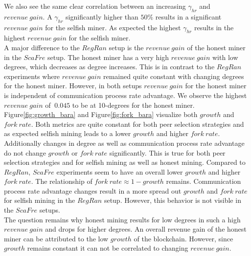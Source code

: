 We also see the same clear correlation between an increasing $\gamma_{hr}$ and $revenue~gain$. A $\gamma_{hr}$ significantly higher than $50\% $ results in a significant $revenue~gain$ for the selfish miner. As expected the highest $\gamma_{hr}$ results in the highest $revenue~gain$ for the selfish miner.\\
A major difference to the $RegRan$ setup is the $revenue~gain$ of the honest miner in the $ScaFre$ setup. The honest miner has a very high $revenue~gain$ with low degrees, which decreases as degree increases. This is in contrast to the $RegRan$ experiments where  $revenue~gain$ remained quite constant with changing degrees for the honest miner. However, in both setups $revenue~gain$ for the honest miner is independent of communication process rate advantage. We observe the highest $revenue~gain$ of $~0.045$ to be at 10-degrees for the honest miner.\\
Figure\ref{fig:growth_bara} and Figure\ref{fig:fork_bara} visualize both $growth$ and $fork~rate$. Both metrics are quite constant for both peer selection strategies and as expected selfish mining leads to a lower $growth$ and higher $fork~rate$. Additionally changes in degree as well as communication process rate advantage do not change $growth$ or $fork~rate$ significantly. This is true for both peer selection strategies and for selfish mining as well as honest mining. Compared to $RegRan$, $ScaFre$ experiments seem to have an overall lower $growth$ and higher $fork~rate$. The relationship of $fork~rate \approx 1-growth$ remains. Communication process rate advantage changes result in a more spread out $growth$ and $fork~rate$ for selfish mining in the $RegRan$ setup. However, this behavior is not visible in the $ScaFre$ setups.\\
The question remains why honest mining results for low degrees in such a high $revenue~gain$ and drops for higher degrees. An overall revenue gain of the honest miner can be attributed to the low $growth$ of the blockchain. However, since $growth$ remains constant it can not be correlated to changing $revenue~gain$.
